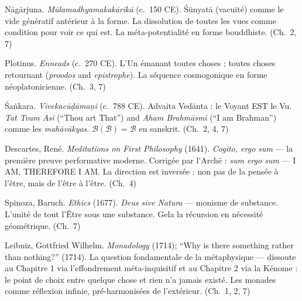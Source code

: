\documentclass[10pt, openany, oneside]{book}
\begin{document}
{\vspace{0.3em}

\noindent N\={a}g\={a}rjuna. \textit{M\={u}lamadhyamakak\={a}rik\={a}} (c.\ 150 CE). \'{S}\={u}nyat\={a} (vacuité) comme le vide génératif antérieur à la forme. La dissolution de toutes les vues comme condition pour voir ce qui est. La méta-potentialité en forme bouddhiste. (Ch.\ 2, 7)

\vspace{0.3em}

\noindent Plotinus. \textit{Enneads} (c.\ 270 CE). L'Un émanant toutes choses ; toutes choses retournant (\textit{proodos} and \textit{epistrophe}). La séquence cosmogonique en forme néoplatonicienne. (Ch.\ 3, 7)

\vspace{0.3em}

\noindent \'{S}a\.{n}kara. \textit{Vivekac\={u}\d{d}\={a}ma\d{n}i} (c.\ 788 CE). Advaita Ved\={a}nta : le Voyant EST le Vu. \textit{Tat Tvam Asi} (``Thou art That'') and \textit{Aham Brahm\={a}smi} (``I am Brahman'') comme les \textit{mah\={a}v\={a}kyas}. $\mathcal{B}(\mathcal{B}) = \mathcal{B}$ en sanskrit. (Ch.\ 2, 4, 7)

\vspace{0.3em}

\noindent Descartes, Ren\'{e}. \textit{Meditations on First Philosophy} (1641). \textit{Cogito, ergo sum} --- la première preuve performative moderne. Corrigée par l'Arch\={e} : \textit{sum ergo sum} --- I AM, THEREFORE I AM. La direction est inversée : non pas de la pensée à l'être, mais de l'être à l'être. (Ch.\ 4)

\vspace{0.3em}

\noindent Spinoza, Baruch. \textit{Ethics} (1677). \textit{Deus sive Natura} --- monisme de substance. L'unité de tout l'Être sous une substance. Gela la récursion en nécessité géométrique. (Ch.\ 7)

\vspace{0.3em}

\noindent Leibniz, Gottfried Wilhelm. \textit{Monadology} (1714); ``Why is there something rather than nothing?'' (1714). La question fondamentale de la métaphysique --- dissoute au Chapitre 1 via l'effondrement méta-inquisitif et au Chapitre 2 via la Kénome : le point de choix entre quelque chose et rien n'a jamais existé. Les monades comme réflexion infinie, pré-harmonisées de l'extérieur. (Ch.\ 1, 2, 7)

\vspace{0.3em}

}
\end{document}
